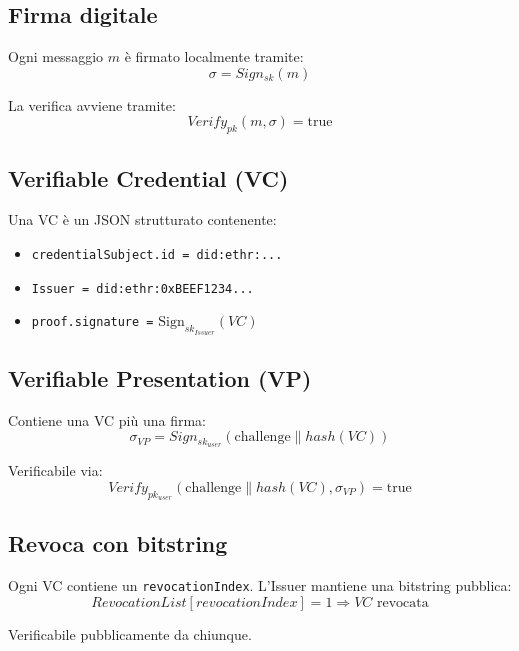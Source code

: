         \subsection{Firma digitale}
            Ogni messaggio $m$ è firmato localmente tramite:
                \[ \sigma = Sign_{sk}(m) \]
            
            La verifica avviene tramite:
                \[ Verify_{pk}(m, \sigma) = \text{true} \]

        \subsection{Verifiable Credential (VC)}
            Una VC è un JSON strutturato contenente:
                \begin{itemize}
                    \item \texttt{credentialSubject.id = did:ethr:...}
                    
                    \item \texttt{Issuer = did:ethr:0xBEEF1234...}
                    
                    \item \texttt{proof.signature =} $\mathrm{Sign}_{sk_{Issuer}}(VC)$
                \end{itemize}

        \subsection{Verifiable Presentation (VP)}
            Contiene una VC più una firma:
                \[ \sigma_{VP} = Sign_{sk_{user}}(\text{challenge} \parallel hash(VC)) \]
            
            Verificabile via:
                \[ Verify_{pk_{user}}(\text{challenge} \parallel hash(VC), \sigma_{VP}) = \text{true} \]
        
        \subsection{Revoca con bitstring}
            Ogni VC contiene un \texttt{revocationIndex}. L'Issuer mantiene una bitstring pubblica:
                \[ RevocationList[revocationIndex] = 1 \Rightarrow VC \text{ revocata} \]
            
            Verificabile pubblicamente da chiunque.


